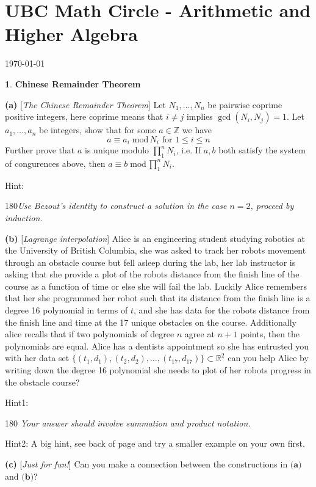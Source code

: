 \documentclass[11pt]{article}
\theoremstyle{definition}
\newtheorem{pb}{}
\newcommand{\set}[1]{\{#1\}}
\begin{document}
\section*{UBC Math Circle - Arithmetic and Higher Algebra}
\today

\begin{pb}
    \textbf{Chinese Remainder Theorem} 
    
    \textbf{(a)} [\emph{The Chinese Remainder Theorem}] Let \(N_1, \hdots, N_n\) be pairwise coprime positive integers, here coprime means that \(i \neq j\) implies \(\gcd(N_i,N_j) = 1\). Let \(a_1,\hdots,a_n\) be integers, show that for some \(a \in \mathbb{Z}\) we have
    \[a \equiv a_i \;\text{mod}\,N_i \text{ for } 1 \leq i \leq n\]
    Further prove that \(a\) is unique modulo \(\prod_1^n N_i\), i.e. If \(a, b\) both satisfy the system of congurences above, then \(a \equiv b \;\text{mod}\,\prod_1^nN_i\).

    \vspace{0.1cm}
    Hint: \begin{turn}{180}\emph{Use Bezout's identity to construct a solution in the case \(n = 2\), proceed by induction.} \end{turn}
    \vspace{0.1cm}

    \textbf{(b)} [\emph{Lagrange interpolation}] Alice is an engineering student studying robotics at the University of British Columbia, she was asked to track her robots movement through an obstacle course but fell asleep during the lab, her lab instructor is asking that she provide a plot of the robots distance from the finish line of the course as a function of time or else she will fail the lab. Luckily Alice remembers that her she programmed her robot such that its distance from the finish line is a degree 16 polynomial in terms of \(t\), and she has data for the robots distance from the finish line and time at the 17 unique obstacles on the course. Additionally alice recalls that if two polynomials of degree \(n\) agree at \(n+1\) points, then the polynomials are equal. Alice has a dentists appointment so she has entrusted you with her data set \(\set{(t_1,d_1),(t_2,d_2),\hdots,(t_{17},d_{17})} \subset \mathbb{R}^2\) can you help Alice by writing down the degree 16 polynomial she needs to plot of her robots progress in the obstacle course?

    \vspace{0.1cm}
    Hint1: \begin{rotate}{180}
        \hspace{-10.5cm} \emph{Your answer should involve summation and product notation.}
    \end{rotate}
    \vspace{0.1cm}

    \vspace{0.1cm}
    Hint2: A big hint, see back of page and try a smaller example on your own first.
    \vspace{0.1cm}

    \textbf{(c)} [\emph{Just for fun!}] Can you make a connection between the constructions in \(\textbf{(a)}\) and \(\textbf{(b)}\)?
\end{pb}
\end{document}
